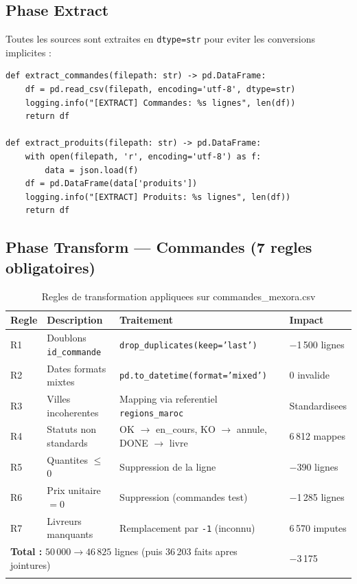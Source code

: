 \documentclass[12pt,a4paper]{article}
\begin{document}
\subsection{Phase Extract}

Toutes les sources sont extraites en \texttt{dtype=str} pour eviter les conversions implicites :

\begin{lstlisting}[style=python, caption=Fonctions d'extraction (extractor.py)]
def extract_commandes(filepath: str) -> pd.DataFrame:
    df = pd.read_csv(filepath, encoding='utf-8', dtype=str)
    logging.info("[EXTRACT] Commandes: %s lignes", len(df))
    return df

def extract_produits(filepath: str) -> pd.DataFrame:
    with open(filepath, 'r', encoding='utf-8') as f:
        data = json.load(f)
    df = pd.DataFrame(data['produits'])
    logging.info("[EXTRACT] Produits: %s lignes", len(df))
    return df
\end{lstlisting}

\subsection{Phase Transform --- Commandes (7 regles obligatoires)}

\begin{longtable}{p{0.8cm} p{3.8cm} p{5.5cm} p{2.5cm}}
\toprule
\textbf{Regle} & \textbf{Description} & \textbf{Traitement} & \textbf{Impact}\\
\midrule
\endhead
R1 & Doublons \texttt{id\_commande} & \texttt{drop\_duplicates(keep='last')} & $-$1\,500 lignes\\
R2 & Dates formats mixtes & \texttt{pd.to\_datetime(format='mixed')} & 0 invalide\\
R3 & Villes incoherentes & Mapping via referentiel \texttt{regions\_maroc} & Standardisees\\
R4 & Statuts non standards & OK $\to$ en\_cours, KO $\to$ annule, DONE $\to$ livre & 6\,812 mappes\\
R5 & Quantites $\leq$ 0 & Suppression de la ligne & $-$390 lignes\\
R6 & Prix unitaire $= 0$ & Suppression (commandes test) & $-$1\,285 lignes\\
R7 & Livreurs manquants & Remplacement par \texttt{-1} (inconnu) & 6\,570 imputes\\
\midrule
\multicolumn{3}{l}{\textbf{Total :} $50\,000 \to 46\,825$ lignes (puis 36\,203 faits apres jointures)} & $-$3\,175\\
\bottomrule
\caption{Regles de transformation appliquees sur commandes\_mexora.csv}
\end{longtable}
\end{document}
